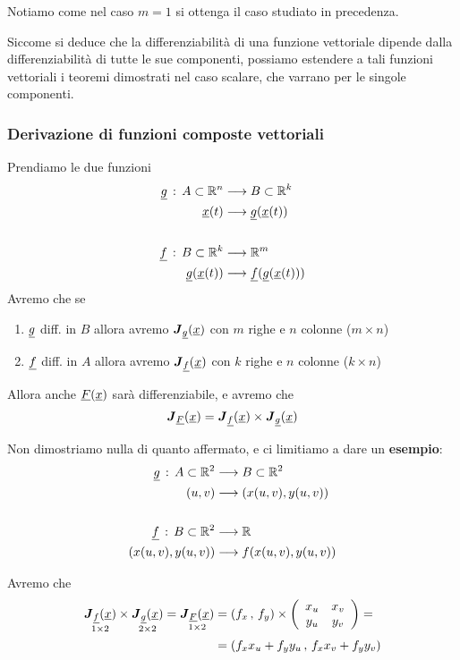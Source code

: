 Notiamo come nel caso $m=1$ si ottenga il caso studiato in precedenza.

Siccome si deduce che la differenziabilità di una funzione vettoriale dipende dalla differenziabilità di tutte le sue componenti, possiamo estendere a tali funzioni vettoriali i teoremi dimostrati nel caso scalare, che varrano per le singole componenti.

\subsubsection{Derivazione di funzioni composte vettoriali}

Prendiamo le due funzioni
\begin{align}
	\underline{g} \, : \, A\subset \mathbb{R}^n {}& \longrightarrow B \subset \mathbb{R}^k \\
	\underline{x}(t) & \longrightarrow \underline{g}(\underline{x}(t)) \nonumber \\
	\nonumber \\
	\underline{f} \, : \, B \subset \mathbb{R}^k & \longrightarrow \mathbb{R}^m \\
	\underline{g}(\underline{x}(t)) & \longrightarrow \underline{f}(\underline{g}(\underline{x}(t)))  \nonumber
\end{align}
Avremo che se
\begin{enumerate}
	\item $\underline{g}$ diff. in $B$ allora avremo $\boldsymbol{J}_{\underline{g}} (\underline{x})$ con $m$ righe e $n$ colonne ($m \times n$)
	\item $\underline{f}$ diff. in $A$ allora avremo $\boldsymbol{J}_{\underline{f}} (\underline{x})$ con $k$ righe e $n$ colonne ($k \times n$)
\end{enumerate}
Allora anche $\underline{F}(\underline{x})$ sarà differenziabile, e avremo che 
\begin{align}
	\boldsymbol{J}_{\underline{F}} (\underline{x})= \boldsymbol{J}_{\underline{f}} (\underline{x}) \times \boldsymbol{J}_{\underline{g}} (\underline{x})
\end{align}

Non dimostriamo nulla di quanto affermato, e ci limitiamo a dare un \textbf{esempio}:
\begin{align}
	\underline{g} \, : \, A\subset \mathbb{R}^2 {}& \longrightarrow B \subset \mathbb{R}^2 \quad  \\
	(u,v) &\longrightarrow (x(u,v), y(u,v)) \nonumber \\
	\nonumber \\
	\underline{f} \, : \, B \subset \mathbb{R}^2 & \longrightarrow \mathbb{R} \\
	(x(u,v), y(u,v)) &\longrightarrow f(x(u,v), y(u,v)) \nonumber
\end{align}

Avremo che
\begin{align}
	\underset{1 \times 2}{\boldsymbol{J}_{\underline{f}} (\underline{x})} \times \underset{2 \times 2}{\boldsymbol{J}_{\underline{g}} (\underline{x})} = \underset{1 \times 2}{\boldsymbol{J}_{\underline{F}} (\underline{x})}{}&= (f_x \, , \, f_y)\times \left( \begin{array}{ccc} x_u & x_v \\ y_u & y_v \end{array} \right) = \nonumber \\
	&= (f_x x_u + f_y y_u \, , \, f_x x_v + f_y y_v)
\end{align}

